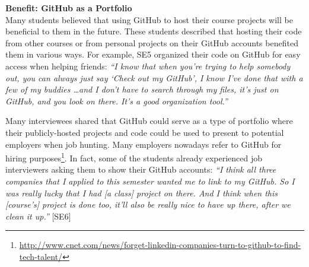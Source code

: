 

\textbf{Benefit: GitHub as a Portfolio} \\
Many students believed that using GitHub to host their course projects will be beneficial to them in the future. These students described that hosting their code from other courses or from personal projects on their GitHub accounts benefited them in various ways. For example, SE5 organized their code on GitHub for easy access when helping friends: \textit{``I know that when you're trying to help somebody out, you can always just say `Check out my GitHub', I know I've done that with a few of my buddies \ldots and I don't have to search through my files, it's just on GitHub, and you look on there. It's a good organization tool.''}

Many interviewees shared that GitHub could serve as a type of portfolio where their publicly-hosted projects and code could be used to present to potential employers when job hunting. Many employers nowadays refer to GitHub for hiring purposes\footnote{\url{http://www.cnet.com/news/forget-linkedin-companies-turn-to-github-to-find-tech-talent/}}. In fact, some of the students already experienced job interviewers asking them to show their GitHub accounts: \textit{``I think all three companies that I applied to this semester wanted me to link to my GitHub. So I was really lucky that I had [a class] project on there. And I think when this [course's] project is done too, it'll also be really nice to have up there, after we clean it up.''} [SE6]

